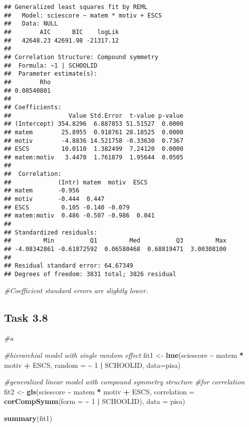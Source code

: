 \documentclass[
]{article}
\newenvironment{Shaded}{\begin{snugshade}}{\end{snugshade}}
\newcommand{\AttributeTok}[1]{\textcolor[rgb]{0.13,0.29,0.53}{#1}}
\newcommand{\CommentTok}[1]{\textcolor[rgb]{0.56,0.35,0.01}{\textit{#1}}}
\newcommand{\DecValTok}[1]{\textcolor[rgb]{0.00,0.00,0.81}{#1}}
\newcommand{\FunctionTok}[1]{\textcolor[rgb]{0.13,0.29,0.53}{\textbf{#1}}}
\newcommand{\NormalTok}[1]{#1}
\newcommand{\OtherTok}[1]{\textcolor[rgb]{0.56,0.35,0.01}{#1}}
\newcommand{\SpecialCharTok}[1]{\textcolor[rgb]{0.81,0.36,0.00}{\textbf{#1}}}
\begin{document}
\begin{verbatim}
## Generalized least squares fit by REML
##   Model: sciescore ~ matem * motiv + ESCS 
##   Data: NULL 
##        AIC      BIC    logLik
##   42648.23 42691.98 -21317.12
## 
## Correlation Structure: Compound symmetry
##  Formula: ~1 | SCHOOLID 
##  Parameter estimate(s):
##        Rho 
## 0.08540801 
## 
## Coefficients:
##                Value Std.Error  t-value p-value
## (Intercept) 354.8296  6.887853 51.51527  0.0000
## matem        25.8955  0.918761 28.18525  0.0000
## motiv        -4.8836 14.521758 -0.33630  0.7367
## ESCS         10.0110  1.382499  7.24120  0.0000
## matem:motiv   3.4470  1.761879  1.95644  0.0505
## 
##  Correlation: 
##             (Intr) matem  motiv  ESCS  
## matem       -0.956                     
## motiv       -0.444  0.447              
## ESCS         0.105 -0.140 -0.079       
## matem:motiv  0.486 -0.507 -0.986  0.041
## 
## Standardized residuals:
##         Min          Q1         Med          Q3         Max 
## -4.08342861 -0.61872592  0.06580468  0.68819471  3.00308100 
## 
## Residual standard error: 64.67349 
## Degrees of freedom: 3831 total; 3826 residual
\end{verbatim}

\begin{Shaded}
\begin{Highlighting}[]
\CommentTok{\#Coefficient standard errors are slightly lower.}
\end{Highlighting}
\end{Shaded}

\hypertarget{task-3.8}{%
\subsection{Task 3.8}\label{task-3.8}}

\begin{Shaded}
\begin{Highlighting}[]
\CommentTok{\#a}

\CommentTok{\#hierarchial model with single random effect}
\NormalTok{fit1 }\OtherTok{\textless{}{-}} \FunctionTok{lme}\NormalTok{(sciescore }\SpecialCharTok{\textasciitilde{}}\NormalTok{ matem }\SpecialCharTok{*}\NormalTok{ motiv }\SpecialCharTok{+}\NormalTok{ ESCS, }\AttributeTok{random =} \SpecialCharTok{\textasciitilde{}} \DecValTok{1} \SpecialCharTok{|}\NormalTok{ SCHOOLID, }\AttributeTok{data=}\NormalTok{pisa)}

\CommentTok{\#generalized linear model with compound symmetry structure}
\CommentTok{\#for correlation}
\NormalTok{fit2 }\OtherTok{\textless{}{-}} \FunctionTok{gls}\NormalTok{(sciescore }\SpecialCharTok{\textasciitilde{}}\NormalTok{ matem }\SpecialCharTok{*}\NormalTok{ motiv }\SpecialCharTok{+}\NormalTok{ ESCS,}
\AttributeTok{correlation =} \FunctionTok{corCompSymm}\NormalTok{(}\AttributeTok{form =} \SpecialCharTok{\textasciitilde{}} \DecValTok{1} \SpecialCharTok{|}\NormalTok{ SCHOOLID), }\AttributeTok{data =}\NormalTok{ pisa)}

\FunctionTok{summary}\NormalTok{(fit1)}
\end{Highlighting}
\end{Shaded}
\end{document}
